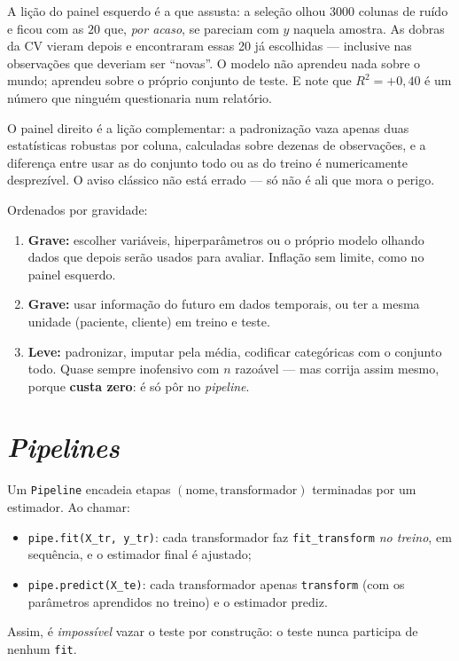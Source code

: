 \documentclass[11pt,a4paper]{article}
\begin{document}
\begin{ideia}
A lição do painel esquerdo é a que assusta: a seleção olhou $3000$ colunas de ruído
e ficou com as $20$ que, \emph{por acaso}, se pareciam com $y$ naquela amostra. As
dobras da CV vieram depois e encontraram essas 20 já escolhidas --- inclusive nas
observações que deveriam ser ``novas''. O modelo não aprendeu nada sobre o mundo;
aprendeu sobre o próprio conjunto de teste. E note que $R^2=+0{,}40$ é um número
que ninguém questionaria num relatório.

O painel direito é a lição complementar: a padronização vaza apenas duas
estatísticas robustas por coluna, calculadas sobre dezenas de observações, e a
diferença entre usar as do conjunto todo ou as do treino é numericamente
desprezível. O aviso clássico não está errado --- só não é ali que mora o perigo.
\end{ideia}

\begin{atencao}
Ordenados por gravidade:
\begin{enumerate}[leftmargin=1.6cm,nosep]
  \item \textbf{Grave:} escolher variáveis, hiperparâmetros ou o próprio modelo
        olhando dados que depois serão usados para avaliar. Inflação sem limite,
        como no painel esquerdo.
  \item \textbf{Grave:} usar informação do futuro em dados temporais, ou ter a
        mesma unidade (paciente, cliente) em treino e teste.
  \item \textbf{Leve:} padronizar, imputar pela média, codificar categóricas com o
        conjunto todo. Quase sempre inofensivo com $n$ razoável --- mas corrija
        assim mesmo, porque \textbf{custa zero}: é só pôr no \emph{pipeline}.
\end{enumerate}
\end{atencao}

\section{\emph{Pipelines}}
Um \texttt{Pipeline} encadeia etapas $(\text{nome}, \text{transformador})$
terminadas por um estimador. Ao chamar:
\begin{itemize}[leftmargin=1.4cm,nosep]
  \item \texttt{pipe.fit(X\_tr, y\_tr)}: cada transformador faz \texttt{fit\_transform}
        \emph{no treino}, em sequência, e o estimador final é ajustado;
  \item \texttt{pipe.predict(X\_te)}: cada transformador apenas \texttt{transform}
        (com os parâmetros aprendidos no treino) e o estimador prediz.
\end{itemize}
Assim, é \emph{impossível} vazar o teste por construção: o teste nunca participa de
nenhum \texttt{fit}.
\end{document}
